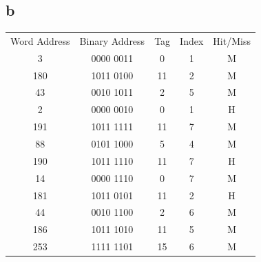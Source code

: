 \documentclass[]{article}
\begin{document}
\subsection*{b}
\begin{center}
	\begin{tabular}{ c c c c c   }
		Word Address & Binary Address & Tag & Index & Hit/Miss\\
		3 & 0000 0011 &  0 & 1 & M\\
		180 & 1011 0100 & 11 & 2 & M\\
		43 & 0010 1011 & 2 & 5 & M\\
		2 & 0000 0010 & 0 & 1 & H\\
		191 & 1011 1111 & 11 & 7 & M\\
		88 & 0101 1000 & 5 & 4 & M\\
		190 & 1011 1110 & 11 & 7 & H\\
		14 & 0000 1110 & 0 & 7 & M\\
		181 & 1011 0101 & 11 & 2 & H\\
		44 & 0010 1100 & 2 & 6 & M\\
		186 & 1011 1010 & 11 & 5 & M\\
		253 & 1111 1101 & 15 & 6 & M\\
	\end{tabular}
\end{center}
\end{document}
